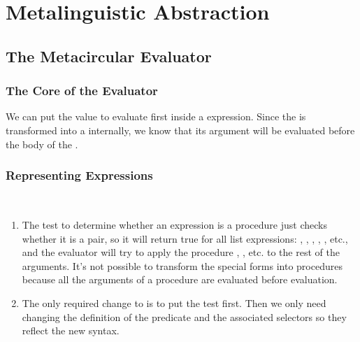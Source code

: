 \chapter{Metalinguistic Abstraction}

\section{The Metacircular Evaluator}

\subsection{The Core of the Evaluator}

\begin{exe}[4.1]
    We can put the value to evaluate first inside a  expression. Since 
    the  is transformed into a  internally, we know that 
    its argument will be evaluated before the body of the .
\end{exe}

\subsection{Representing Expressions}

\begin{exe}[4.2]
    \ \vspace{-20pt}
    \begin{enumerate}
        \item The test to determine whether an expression is a procedure just 
            checks whether it is a pair, so it will return true for all list 
            expressions: , , , , 
            , etc., and the evaluator will try to apply the procedure 
            , , etc. to the rest of the arguments. It’s not 
            possible to transform the special forms into procedures because all 
            the arguments of a procedure are evaluated before evaluation.
        \item The only required change to  is to put the 
             test first. Then we only need changing the 
            definition of the  predicate and the associated 
            selectors so they reflect the new syntax.
    \end{enumerate}
\end{exe}

